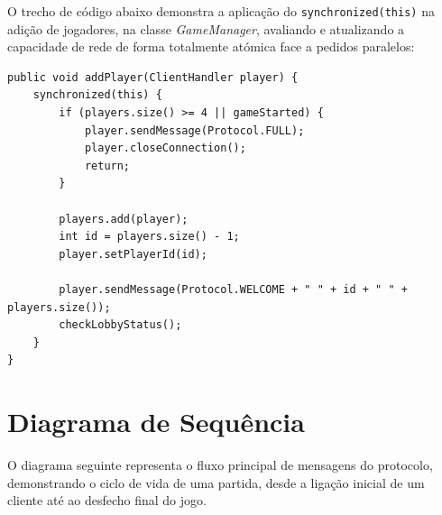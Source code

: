 \documentclass[11pt,a4paper,oneside]{report}
\begin{document}
O trecho de código abaixo demonstra a aplicação do \texttt{synchronized(this)} na adição de jogadores, na classe \textit{GameManager}, avaliando e atualizando a capacidade de rede de forma totalmente atómica face a pedidos paralelos:

\begin{lstlisting}[caption={Exclusão Mútua ao adicionar jogadores}]
public void addPlayer(ClientHandler player) {
    synchronized(this) {
        if (players.size() >= 4 || gameStarted) {
            player.sendMessage(Protocol.FULL);
            player.closeConnection();
            return;
        }

        players.add(player);
        int id = players.size() - 1;
        player.setPlayerId(id);

        player.sendMessage(Protocol.WELCOME + " " + id + " " + players.size());
        checkLobbyStatus();
    }
}
\end{lstlisting}

\section{Diagrama de Sequência}
O diagrama seguinte representa o fluxo principal de mensagens do protocolo, demonstrando o ciclo de vida de uma partida, desde a ligação inicial de um cliente até ao desfecho final do jogo.
\end{document}

